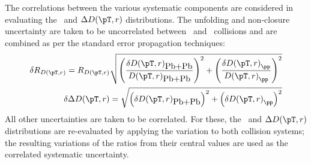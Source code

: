 The correlations between the various systematic components are considered in evaluating the \RDptr\ and $\Delta\Dptr$ distributions. The unfolding and non-closure uncertainty are taken to be uncorrelated between \pp\ and \pbpb\ collisions and are combined as per the standard error propagation techniques:
\begin{align}
\delta \RDptr = \RDptr \sqrt{\left(\frac{\delta \Dptr_{\pbpb}}{\Dptr_{\pbpb}}\right)^2 + \left(\frac{\delta \Dptr_{\pp}}{\Dptr_{\pp}}\right)^2} \\
\delta \Delta\Dptr =  \sqrt{\left(\delta \Dptr_{\pbpb}\right)^2 + \left(\delta \Dptr_{\pp}\right)^2}
\end{align}
All other uncertainties are taken to be correlated. For these, the \RDptr\ and $\Delta\Dptr$ distributions are re-evaluated by applying the variation to both collision systems; the resulting variations of the ratios from their central values are used as the correlated systematic uncertainty. 


